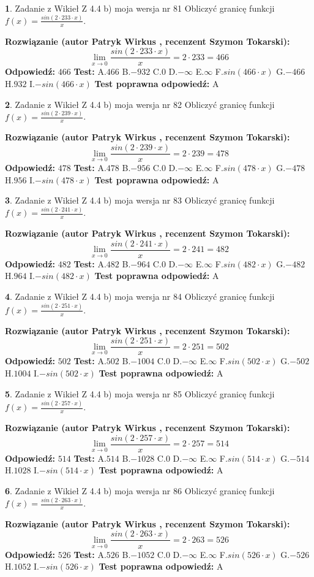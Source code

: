 \documentclass[12pt, a4paper]{article}
\theoremstyle{definition} %
\newtheorem{zad}{}
\newcommand{\zadStart}[1]{\begin{zad}#1\newline}
\newcommand{\zadStop}{\end{zad}}
\newcommand{\rozwStart}[2]{\noindent \textbf{Rozwiązanie (autor #1 , recenzent #2): }\newline}
\newcommand{\rozwStop}{\newline}
\newcommand{\odpStart}{\noindent \textbf{Odpowiedź:}\newline}
\newcommand{\odpStop}{\newline}
\newcommand{\testStart}{\noindent \textbf{Test:}\newline}
\newcommand{\testStop}{\newline}
\newcommand{\kluczStart}{\noindent \textbf{Test poprawna odpowiedź:}\newline}
\newcommand{\kluczStop}{\newline}
\begin{document}
\zadStart{Zadanie z Wikieł Z 4.4 b) moja wersja nr 81}
Obliczyć granicę funkcji $f(x)=\frac{sin(2 \cdot233\cdot x)}{x}$.
\zadStop
\rozwStart{Patryk Wirkus}{Szymon Tokarski}
$$\lim\limits_{x\to 0}\frac{sin(2 \cdot 233\cdot x)}{x}=
2 \cdot 233 = 466$$
\rozwStop
\odpStart
$466$
\odpStop
\testStart
A.$466$
B.$-932$
C.$0$
D.$-\infty$
E.$\infty$
F.$sin(466\cdot x)$
G.$-466$
H.$932$
I.$-sin(466\cdot x)$
\testStop
\kluczStart
A
\kluczStop



\zadStart{Zadanie z Wikieł Z 4.4 b) moja wersja nr 82}
Obliczyć granicę funkcji $f(x)=\frac{sin(2 \cdot239\cdot x)}{x}$.
\zadStop
\rozwStart{Patryk Wirkus}{Szymon Tokarski}
$$\lim\limits_{x\to 0}\frac{sin(2 \cdot 239\cdot x)}{x}=
2 \cdot 239 = 478$$
\rozwStop
\odpStart
$478$
\odpStop
\testStart
A.$478$
B.$-956$
C.$0$
D.$-\infty$
E.$\infty$
F.$sin(478\cdot x)$
G.$-478$
H.$956$
I.$-sin(478\cdot x)$
\testStop
\kluczStart
A
\kluczStop



\zadStart{Zadanie z Wikieł Z 4.4 b) moja wersja nr 83}
Obliczyć granicę funkcji $f(x)=\frac{sin(2 \cdot241\cdot x)}{x}$.
\zadStop
\rozwStart{Patryk Wirkus}{Szymon Tokarski}
$$\lim\limits_{x\to 0}\frac{sin(2 \cdot 241\cdot x)}{x}=
2 \cdot 241 = 482$$
\rozwStop
\odpStart
$482$
\odpStop
\testStart
A.$482$
B.$-964$
C.$0$
D.$-\infty$
E.$\infty$
F.$sin(482\cdot x)$
G.$-482$
H.$964$
I.$-sin(482\cdot x)$
\testStop
\kluczStart
A
\kluczStop



\zadStart{Zadanie z Wikieł Z 4.4 b) moja wersja nr 84}
Obliczyć granicę funkcji $f(x)=\frac{sin(2 \cdot251\cdot x)}{x}$.
\zadStop
\rozwStart{Patryk Wirkus}{Szymon Tokarski}
$$\lim\limits_{x\to 0}\frac{sin(2 \cdot 251\cdot x)}{x}=
2 \cdot 251 = 502$$
\rozwStop
\odpStart
$502$
\odpStop
\testStart
A.$502$
B.$-1004$
C.$0$
D.$-\infty$
E.$\infty$
F.$sin(502\cdot x)$
G.$-502$
H.$1004$
I.$-sin(502\cdot x)$
\testStop
\kluczStart
A
\kluczStop



\zadStart{Zadanie z Wikieł Z 4.4 b) moja wersja nr 85}
Obliczyć granicę funkcji $f(x)=\frac{sin(2 \cdot257\cdot x)}{x}$.
\zadStop
\rozwStart{Patryk Wirkus}{Szymon Tokarski}
$$\lim\limits_{x\to 0}\frac{sin(2 \cdot 257\cdot x)}{x}=
2 \cdot 257 = 514$$
\rozwStop
\odpStart
$514$
\odpStop
\testStart
A.$514$
B.$-1028$
C.$0$
D.$-\infty$
E.$\infty$
F.$sin(514\cdot x)$
G.$-514$
H.$1028$
I.$-sin(514\cdot x)$
\testStop
\kluczStart
A
\kluczStop



\zadStart{Zadanie z Wikieł Z 4.4 b) moja wersja nr 86}
Obliczyć granicę funkcji $f(x)=\frac{sin(2 \cdot263\cdot x)}{x}$.
\zadStop
\rozwStart{Patryk Wirkus}{Szymon Tokarski}
$$\lim\limits_{x\to 0}\frac{sin(2 \cdot 263\cdot x)}{x}=
2 \cdot 263 = 526$$
\rozwStop
\odpStart
$526$
\odpStop
\testStart
A.$526$
B.$-1052$
C.$0$
D.$-\infty$
E.$\infty$
F.$sin(526\cdot x)$
G.$-526$
H.$1052$
I.$-sin(526\cdot x)$
\testStop
\kluczStart
A
\kluczStop
\end{document}
